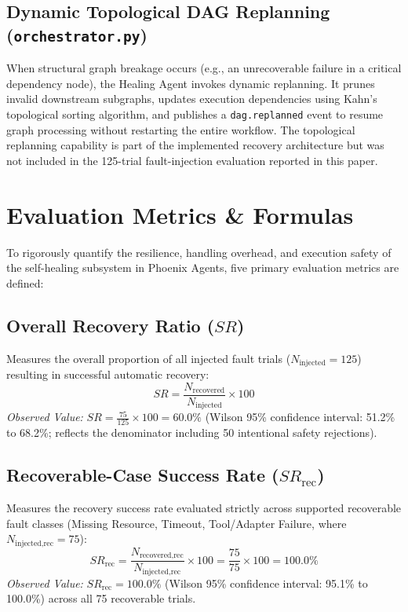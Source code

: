 \documentclass[conference]{IEEEtran}
\newcommand{\chg}[1]{{\color{blue}#1}}
\begin{document}
\subsection{Dynamic Topological DAG Replanning (\texttt{orchestrator.py})}
When structural graph breakage occurs (e.g., an unrecoverable failure in a critical dependency node), the Healing Agent invokes dynamic replanning. It prunes invalid downstream subgraphs, updates execution dependencies using Kahn's topological sorting algorithm, and publishes a \texttt{dag.replanned} event to resume graph processing without restarting the entire workflow. The topological replanning capability is part of the implemented recovery architecture but was not included in the 125-trial fault-injection evaluation reported in this paper.

\section{Evaluation Metrics \& Formulas}
To rigorously quantify the resilience, handling overhead, and execution safety of the self-healing subsystem in Phoenix Agents, five primary evaluation metrics are defined:

\subsection{Overall Recovery Ratio ($SR$)}
Measures the overall proportion of all injected fault trials ($N_{\text{injected}} = 125$) resulting in successful automatic recovery:
\begin{equation}
SR = \frac{N_{\text{recovered}}}{N_{\text{injected}}} \times 100
\end{equation}
\textit{Observed Value:} $SR = \frac{75}{125} \times 100 = 60.0\%$ \chg{(Wilson 95\% confidence interval: 51.2\% to 68.2\%; reflects the denominator including 50 intentional safety rejections).}

\subsection{Recoverable-Case Success Rate ($SR_{\text{rec}}$)}
Measures the recovery success rate evaluated strictly across supported recoverable fault classes (Missing Resource, Timeout, Tool/Adapter Failure, where $N_{\text{injected,rec}} = 75$):
\begin{equation}
SR_{\text{rec}} = \frac{N_{\text{recovered,rec}}}{N_{\text{injected,rec}}} \times 100 = \frac{75}{75} \times 100 = 100.0\%
\end{equation}
\textit{Observed Value:} $SR_{\text{rec}} = 100.0\%$ \chg{(Wilson 95\% confidence interval: 95.1\% to 100.0\%)} across all 75 recoverable trials.
\end{document}
